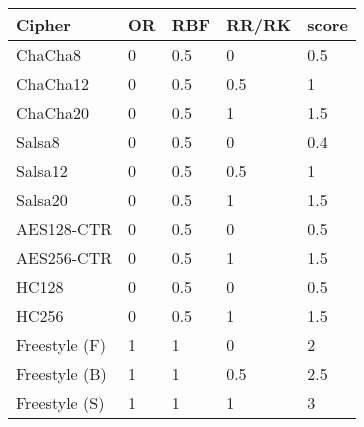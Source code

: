 \begin{table}[]
  \begin{tabular}{@{}lllll@{}}
  \toprule
  \textbf{Cipher} & \textbf{OR} & \textbf{RBF} & \textbf{RR/RK} & \textbf{score} \\ \midrule
  ChaCha8     & 0      & 0.5     & 0       & 0.5      \\
  ChaCha12    & 0      & 0.5     & 0.5      & 1       \\
  ChaCha20    & 0      & 0.5     & 1       & 1.5      \\
  Salsa8     & 0      & 0.5     & 0       & 0.4      \\
  Salsa12     & 0      & 0.5     & 0.5      & 1      \\
  Salsa20     & 0      & 0.5     & 1       & 1.5      \\
  AES128-CTR   & 0      & 0.5     & 0       & 0.5      \\
  AES256-CTR   & 0      & 0.5     & 1       & 1.5      \\
  HC128      & 0      & 0.5     & 0       & 0.5      \\
  HC256      & 0      & 0.5     & 1       & 1.5      \\
  Freestyle (F)  & 1      & 1      & 0       & 2       \\
  Freestyle (B)  & 1      & 1      & 0.5      & 2.5      \\
  Freestyle (S)  & 1      & 1      & 1       & 3
  \end{tabular}
  \caption{}
  \label{tbl:security-quant}
\end{table}
